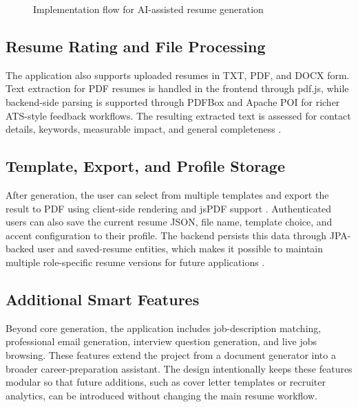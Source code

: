 \begin{figure}[H]
\centering
{}
\caption{Implementation flow for AI-assisted resume generation}
\end{figure}

\subsection{Resume Rating and File Processing}
\noindent The application also supports uploaded resumes in TXT, PDF, and DOCX form. Text extraction for PDF resumes is handled in the frontend through pdf.js, while backend-side parsing is supported through PDFBox and Apache POI for richer ATS-style feedback workflows. The resulting extracted text is assessed for contact details, keywords, measurable impact, and general completeness \cite{pdfjs_docs,pdfbox_docs,poi_docs}.

\subsection{Template, Export, and Profile Storage}
\noindent After generation, the user can select from multiple templates and export the result to PDF using client-side rendering and jsPDF support \cite{jspdf_docs}. Authenticated users can also save the current resume JSON, file name, template choice, and accent configuration to their profile. The backend persists this data through JPA-backed user and saved-resume entities, which makes it possible to maintain multiple role-specific resume versions for future applications \cite{spring_data_docs}.

\subsection{Additional Smart Features}
\noindent Beyond core generation, the application includes job-description matching, professional email generation, interview question generation, and live jobs browsing. These features extend the project from a document generator into a broader career-preparation assistant. The design intentionally keeps these features modular so that future additions, such as cover letter templates or recruiter analytics, can be introduced without changing the main resume workflow.
